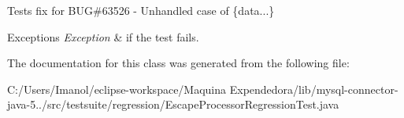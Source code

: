 Tests fix for B\+UG\#63526 -\/ Unhandled case of \{data...\}


\begin{DoxyExceptions}{Exceptions}
{\em Exception} & if the test fails. \\
\hline
\end{DoxyExceptions}


The documentation for this class was generated from the following file\+:\begin{DoxyCompactItemize}
\item 
C\+:/\+Users/\+Imanol/eclipse-\/workspace/\+Maquina Expendedora/lib/mysql-\/connector-\/java-\/5../src/testsuite/regression/Escape\+Processor\+Regression\+Test.\+java\end{DoxyCompactItemize}

